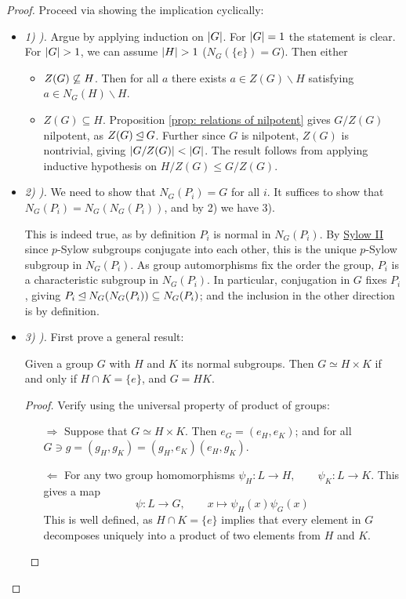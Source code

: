 \documentclass{article}
\begin{document}
\begin{proof}
    Proceed via showing the implication cyclically:
    \begin{itemize}
        \item \emph{1) ).} Argue by applying induction on $\left|G\right|$. For $\left|G\right| = 1$ the statement is clear. For $\left|G\right| > 1$, we can assume $\left|H\right| > 1$ ($N_G(\{e\}) = G$). Then either
        \begin{itemize}
            \item $Z(G) \centernot \subseteq H$. Then for all $a$ there exists $a \in Z(G) \smallsetminus H$ satisfying $a \in N_G(H) \smallsetminus H$.
            \item $Z(G) \subseteq H$. Proposition \ref{prop: relations of nilpotent} gives $G/Z(G)$ nilpotent, as $Z(G) \unlhd G$. Further since $G$ is nilpotent, $Z(G)$ is nontrivial, giving $\left|G/Z(G)\right| < \left|G\right|$. The result follows from applying inductive hypothesis on $H/Z(G) \leq G/Z(G)$.
        \end{itemize}
        \item \emph{2) ).} We need to show that $N_G(P_i) = G$ for all $i$. It suffices to show that $N_G(P_i) = N_G(N_G(P_i))$, and by 2) we have 3).
        
        This is indeed true, as by definition $P_i$ is normal in $N_G(P_i)$. By \hyperref[thm: Sylow II]{Sylow II} since $p$-Sylow subgroups conjugate into each other, this is the unique $p$-Sylow subgroup in $N_G(P_i)$. As group automorphisms fix the order the group, $P_i$ is a characteristic subgroup in $N_G(P_i)$. In particular, conjugation in $G$ fixes $P_i$, giving $P_i \unlhd N_G(N_G(P_i)) \subseteq N_G(P_i)$; and the inclusion in the other direction is by definition.
        \item \emph{3) ).} First prove a general result:
        
        \begin{parenthesis}
            Given a group $G$ with $H$ and $K$ its normal subgroups. Then $G \simeq H \times K$ if and only if $H \cap K = \{e\}$, and $G = HK$.
        \end{parenthesis}

        \begin{proof}
            Verify using the universal property of product of groups:
            \begin{enumerate}
                \item[$\Rightarrow$] Suppose that $G \simeq H \times K$. Then $e_G = (e_H, e_K)$; and for all $G \ni g = (g_H, g_K) = (g_H, e_K) (e_H, g_K)$.
                \item[$\Leftarrow$] For any two group homomorphisms $\psi_H: L \to H, \qquad \psi_K: L \to K$. This gives a map 
                \[
                    \psi: L \to G, \qquad x \mapsto \psi_H(x) \psi_G(x)
                \]
                This is well defined, as $H \cap K = \{e\}$ implies that every element in $G$ decomposes uniquely into a product of two elements from $H$ and $K$.
            \end{enumerate}
        \end{proof}


\end{itemize}
\end{proof}
\end{document}
